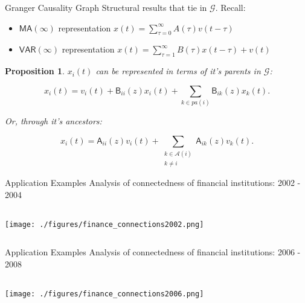 \documentclass{beamer} %
\newtheorem*{proposition}{Proposition}
\def\gcg{\mathcal{G}}  %
\def\B{\mathsf{B}}  %
\def\A{\mathsf{A}}  %
\newcommand{\pa}[1]{pa(#1)}  %
\newcommand{\anc}[1]{\mathcal{A}(#1)}  %
\begin{document}
\begin{frame}{Granger Causality Graph}
  Structural results that tie in $\gcg$.  Recall:
  \begin{itemize}
    \item{$\mathsf{MA}(\infty)$ representation $x(t) = \sum_{\tau = 0}^\infty A(\tau)v(t - \tau)$}\pause
    \item{$\mathsf{VAR}(\infty)$ representation $x(t) = \sum_{\tau = 1}^\infty B(\tau)x(t - \tau) + v(t)$}\pause
  \end{itemize}

  \begin{proposition}
  $x_i(t)$ can be represented in terms of it's parents in $\gcg$:

  \begin{equation}
    \label{eqn:parent_expansion}
    x_i(t) = v_i(t) + \B_{ii}(z)x_i(t) + \sum_{k \in \pa{i}}\B_{ik}(z)x_k(t).
  \end{equation}\pause

  Or, through it's ancestors:

  \begin{equation}
    \label{eqn:ancestor_expansion}
    x_i(t) = \A_{ii}(z)v_i(t) + \sum_{\substack{k \in \anc{i} \\ k \ne i}}\A_{ik}(z)v_k(t).
  \end{equation}
    
  \end{proposition}
\end{frame}

\begin{frame}{Application Examples}
  Analysis of connectedness of financial institutions: 2002 - 2004

  \begin{columns}
    \begin{column}{0.75\linewidth}
      \texttt{[image: ./figures/finance\_connections2002.png]}
    \end{column}
  \end{columns}

\end{frame}

\begin{frame}{Application Examples}
  Analysis of connectedness of financial institutions: 2006 - 2008

  \begin{columns}
    \begin{column}{0.75\linewidth}
      \texttt{[image: ./figures/finance\_connections2006.png]}
    \end{column}
  \end{columns}

\end{frame}
\end{document}
